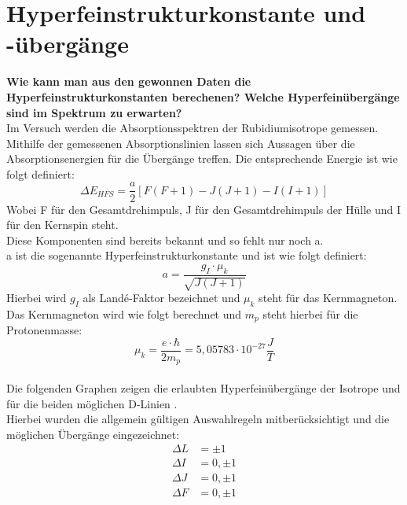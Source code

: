 \section{Hyperfeinstrukturkonstante und -übergänge}
\textbf{Wie kann man aus den gewonnen Daten die Hyperfeinstrukturkonstanten berechenen?
Welche Hyperfeinübergänge sind im Spektrum zu erwarten?}\\
Im Versuch werden die Absorptionsspektren der Rubidiumisotrope gemessen. 
Mithilfe der gemessenen Absorptionslinien lassen sich Aussagen über die
Absorptionsenergien für die Übergänge treffen. Die entsprechende Energie 
ist wie folgt definiert:
\begin{equation}
    \Delta E_{HFS} = \frac{a}{2}[F(F+1)-J(J+1)-I(I+1)]
\end{equation}
Wobei F für den Gesamtdrehimpuls, J für den Gesamtdrehimpuls der Hülle und I für den Kernspin steht. \\
Diese Komponenten sind bereits bekannt und so fehlt nur noch a.\\
a ist die sogenannte Hyperfeinstrukturkonstante und ist wie folgt definiert:
\begin{equation}
    a = \frac{g_I \cdot \mu_k}{\sqrt{J(J+1)}}
\end{equation}
Hierbei wird $g_I$ als Landé-Faktor bezeichnet und $\mu_k$ steht für das Kernmagneton.\\
Das Kernmagneton wird wie folgt berechnet und $m_p$ steht hierbei für die Protonenmasse:
\begin{equation*}
    \mu_k = \frac{e \cdot \hbar}{2 m_p} = 5,05783 \cdot 10^{-27} \frac{J}{T}
\end{equation*}
\citep[vgl.][]{Kohler}\\
Die folgenden Graphen zeigen die erlaubten Hyperfeinübergänge der Isotrope  
und  für die beiden möglichen D-Linien \citep[entnommen][]{AnhangA, AnhangB}.\\
Hierbei wurden die allgemein gültigen Auswahlregeln mitberücksichtigt und die möglichen Übergänge 
eingezeichnet:
\begin{align*}
    \Delta L &= \pm 1\\
    \Delta I &= 0, \pm 1\\
    \Delta J &= 0, \pm 1\\
    \Delta F &= 0, \pm 1\\
\end{align*}
